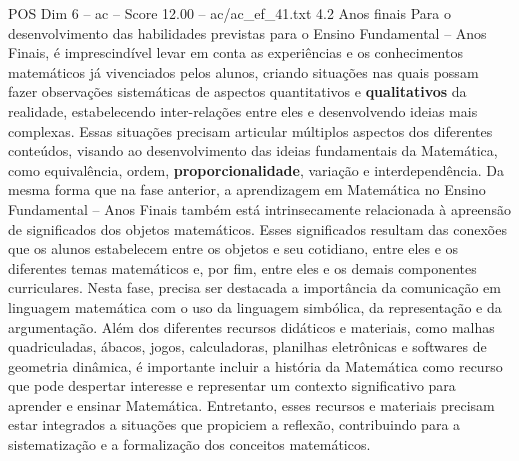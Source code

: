 \begin{textsample}{POS Dim 6 – ac – Score 12.00 – ac/ac\_ef\_41.txt}  \label{ex:f6_pos_152}
4.2 Anos finais Para o desenvolvimento das habilidades previstas para o Ensino Fundamental – Anos Finais, é imprescindível levar em conta as experiências e os conhecimentos matemáticos já vivenciados pelos alunos, criando situações nas quais possam fazer observações sistemáticas de aspectos quantitativos e \textbf{qualitativos} da realidade, estabelecendo inter-relações entre eles e desenvolvendo ideias mais complexas.
Essas situações precisam articular múltiplos aspectos dos diferentes conteúdos, visando ao desenvolvimento das ideias fundamentais da Matemática, como equivalência, ordem, \textbf{proporcionalidade}, variação e interdependência.
Da mesma forma que na fase anterior, a aprendizagem em Matemática no Ensino Fundamental – Anos Finais também está intrinsecamente relacionada à apreensão de significados dos objetos matemáticos.
Esses significados resultam das conexões que os alunos estabelecem entre os objetos e seu cotidiano, entre eles e os diferentes temas matemáticos e, por fim, entre eles e os demais componentes curriculares.
Nesta fase, precisa ser destacada a importância da comunicação em linguagem matemática com o uso da linguagem simbólica, da representação e da argumentação.
Além dos diferentes recursos didáticos e materiais, como malhas quadriculadas, ábacos, jogos, calculadoras, planilhas eletrônicas e softwares de geometria dinâmica, é importante incluir a história da Matemática como recurso que pode despertar interesse e representar um contexto significativo para aprender e ensinar Matemática.
Entretanto, esses recursos e materiais precisam estar integrados a situações que propiciem a reflexão, contribuindo para a sistematização e a formalização dos conceitos matemáticos.

\end{textsample}
